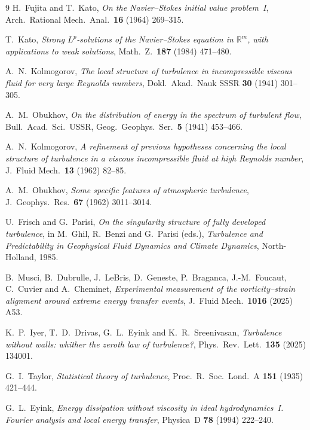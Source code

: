 \documentclass[11pt]{article}
\begin{document}
\vspace{1.5em}
\begin{thebibliography}{9}
 H.~Fujita and T.~Kato, \emph{On the Navier--Stokes initial value problem~I},
Arch.\ Rational Mech.\ Anal.\ \textbf{16} (1964) 269--315.

 T.~Kato, \emph{Strong $L^p$-solutions of the Navier--Stokes equation in
$\mathbb{R}^m$, with applications to weak solutions}, Math.\ Z.\ \textbf{187} (1984) 471--480.

 A.~N.~Kolmogorov, \emph{The local structure of turbulence in incompressible
viscous fluid for very large Reynolds numbers}, Dokl.\ Akad.\ Nauk SSSR \textbf{30} (1941) 301--305.

 A.~M.~Obukhov, \emph{On the distribution of energy in the spectrum of turbulent
flow}, Bull.\ Acad.\ Sci.\ USSR, Geog.\ Geophys.\ Ser.\ \textbf{5} (1941) 453--466.

 A.~N.~Kolmogorov, \emph{A refinement of previous hypotheses concerning the
local structure of turbulence in a viscous incompressible fluid at high Reynolds number}, J.\ Fluid
Mech.\ \textbf{13} (1962) 82--85.

 A.~M.~Obukhov, \emph{Some specific features of atmospheric turbulence}, J.\
Geophys.\ Res.\ \textbf{67} (1962) 3011--3014.

 U.~Frisch and G.~Parisi, \emph{On the singularity structure of fully developed
turbulence}, in M.~Ghil, R.~Benzi and G.~Parisi (eds.), \emph{Turbulence and Predictability in
Geophysical Fluid Dynamics and Climate Dynamics}, North-Holland, 1985.

 B.~Musci, B.~Dubrulle, J.~LeBris, D.~Geneste, P.~Braganca, J.-M.~Foucaut, C.~Cuvier
and A.~Cheminet, \emph{Experimental measurement of the vorticity--strain alignment around extreme
energy transfer events}, J.\ Fluid Mech.\ \textbf{1016} (2025) A53.

 K.~P.~Iyer, T.~D.~Drivas, G.~L.~Eyink and K.~R.~Sreenivasan, \emph{Turbulence without
walls: whither the zeroth law of turbulence?}, Phys.\ Rev.\ Lett.\ \textbf{135} (2025) 134001.

 G.~I.~Taylor, \emph{Statistical theory of turbulence}, Proc.\ R.\ Soc.\ Lond.\ A
\textbf{151} (1935) 421--444.

 G.~L.~Eyink, \emph{Energy dissipation without viscosity in ideal hydrodynamics~I.
Fourier analysis and local energy transfer}, Physica~D \textbf{78} (1994) 222--240.


\end{thebibliography}
\end{document}
